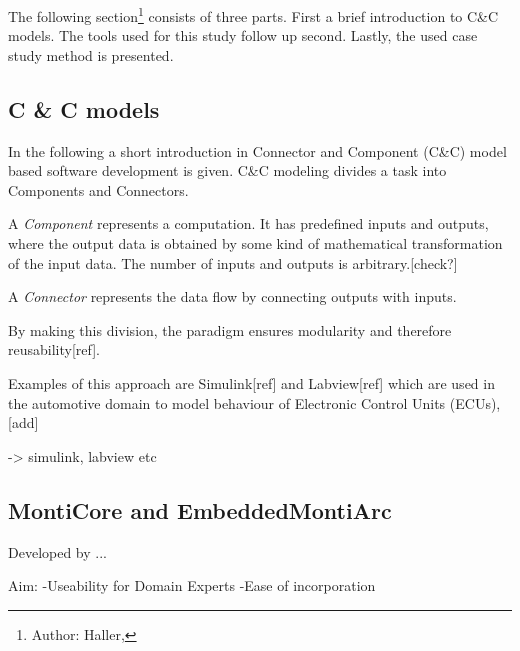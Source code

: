 The following section\footnote{Author: Haller, } consists of three parts. First a brief introduction to C\&C models. The tools used for this study follow up second. Lastly, the used case study method is presented.


\subsection{C \& C models}

In the following a short introduction in Connector and Component (C\&C) model based software development is given. C\&C modeling divides a task into Components and Connectors. 

A \emph{Component} represents a computation. It has predefined inputs and outputs, where the output data is obtained by some kind of mathematical transformation of the input data. The number of inputs and outputs is arbitrary.[check?]

A \emph{Connector} represents the data flow by connecting outputs with inputs.  

By making this division, the paradigm ensures modularity and therefore reusability[ref].

Examples of this approach are Simulink[ref] and Labview[ref] which are used in the automotive domain to model behaviour of Electronic Control Units (ECUs), [add]


-> simulink, labview etc

\subsection{MontiCore and EmbeddedMontiArc}

Developed by ...


Aim:
-Useability for Domain Experts
-Ease of incorporation






